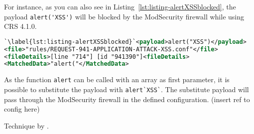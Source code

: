 For instance, as you can also see in Listing~\ref{lst:listing-alertXSSblocked}, the payload \verb|alert('XSS')| will be blocked by the ModSecurity firewall while using CRS 4.1.0.

\begin{lstlisting}[style=ruleStyle, language=XML, caption=alert("XSS") blocking example]
`\label{lst:listing-alertXSSblocked}`<payload>alert("XSS")</payload>
<file>"rules/REQUEST-941-APPLICATION-ATTACK-XSS.conf"</file>
<fileDetails>[line "714"] [id "941390"]<fileDetails>
<MatchedData>"alert("</MatchedData>
\end{lstlisting}

As the function \verb|alert| can be called with an array as first parameter, it is possible to substitute the payload with \verb|alert`XSS`|. The substitute payload will pass through the ModSecurity firewall in the defined configuration. {\color{red}(insert ref to config here)}

Technique by \cite{onecons/wafbypass}.

\label{sec:XSS Payloads}
